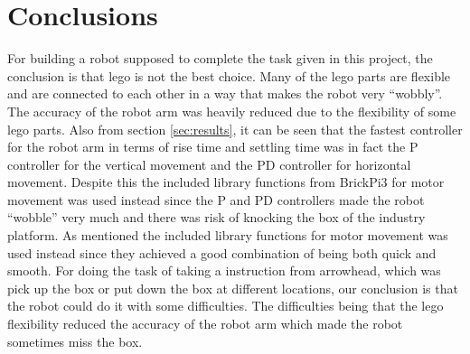 \section{Conclusions}
\label{sec:simon18}
For building a robot supposed to complete the task given in this project, the conclusion is that lego is not the best choice. Many of the lego parts are flexible and are connected to each other in a way that makes the robot very ``wobbly''. The accuracy of the robot arm was heavily reduced due to the flexibility of some lego parts. Also from section \ref{sec:results}, it can be seen that the fastest controller for the robot arm in terms of rise time and settling time was in fact the P controller for the vertical movement and the PD controller for horizontal movement. Despite this the included library functions from BrickPi3 for motor movement was used instead since the P and PD controllers made the robot ``wobble'' very much and there was risk of knocking the box of the industry platform. As mentioned the included library functions for motor movement was used instead since they achieved a good combination of being both quick and smooth.
For doing the task of taking a instruction from arrowhead, which was pick up the box or put down the box at different locations, our conclusion is that the robot could do it with some difficulties. The difficulties being that the lego flexibility reduced the accuracy of the robot arm which made the robot sometimes miss the box.
